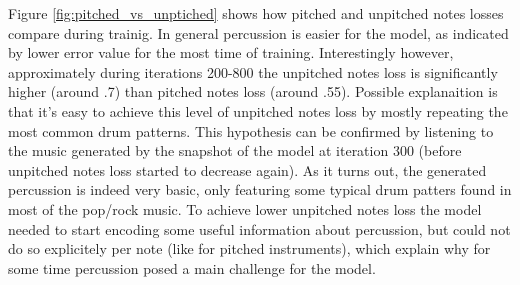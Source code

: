 \documentclass[en]{pracamgr}
\begin{document}
Figure \ref{fig:pitched_vs_unptiched} shows how pitched and unpitched notes losses compare during trainig.
In general percussion is easier for the model, as indicated by lower error value for the most time of training.
Interestingly however, approximately during iterations 200-800 the unpitched notes loss is significantly higher (around .7) than pitched notes loss (around .55).
Possible explanaition is that it's easy to achieve this level of unpitched notes loss by mostly repeating the most common drum patterns.
This hypothesis can be confirmed by listening to the music generated by the snapshot of the model at iteration 300 (before unpitched notes loss started to decrease again).
As it turns out, the generated percussion is indeed very basic, only featuring some typical drum patters found in most of the pop/rock music.
To achieve lower unpitched notes loss the model needed to start encoding some useful information about percussion, but could not do so explicitely per note (like for pitched instruments), which explain why for some time percussion posed a main challenge for the model.
\end{document}
